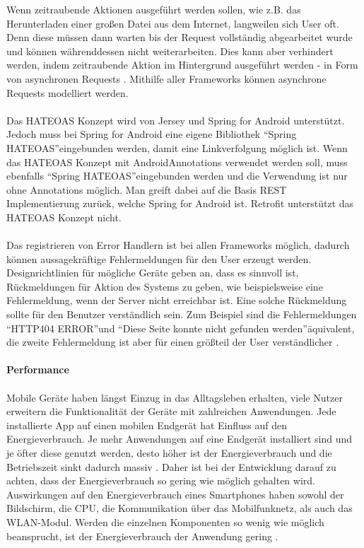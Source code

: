 Wenn zeitraubende Aktionen ausgeführt werden sollen, wie z.B. das Herunterladen einer großen Datei aus dem Internet, langweilen sich User oft. Denn diese müssen dann warten bis der Request vollständig abgearbeitet wurde und können währenddessen nicht weiterarbeiten. Dies kann aber verhindert werden, indem zeitraubende Aktion im Hintergrund ausgeführt werden - in Form von asynchronen Requests \cite{louis:android}. Mithilfe aller Frameworks können asynchrone Requests modelliert werden. 
\\\\
Das HATEOAS Konzept wird von Jersey und Spring for Android unterstützt. Jedoch muss bei Spring for Android eine eigene Bibliothek \textquotedblleft Spring HATEOAS\textquotedblright eingebunden werden, damit eine Linkverfolgung möglich ist. Wenn das HATEOAS Konzept mit AndroidAnnotations verwendet werden soll, muss ebenfalls \textquotedblleft Spring HATEOAS\textquotedblright eingebunden werden und die Verwendung ist nur ohne Annotations möglich. Man greift dabei auf die Basis REST Implementierung zurück, welche Spring for Android ist. Retrofit unterstützt das HATEOAS Konzept nicht.
\\\\
Das registrieren von Error Handlern ist bei allen Frameworks möglich, dadurch können aussagekräftige Fehlermeldungen für den User erzeugt werden. Designrichtlinien für mögliche Geräte geben an, dass es sinnvoll ist, Rückmeldungen für Aktion des Systems zu geben, wie beispielsweise eine Fehlermeldung, wenn der Server nicht erreichbar ist. Eine solche Rückmeldung sollte für den Benutzer verständlich sein. Zum Beispiel sind die Fehlermeldungen \textquotedblleft HTTP404 ERROR\textquotedblright und \textquotedblleft Diese Seite konnte nicht gefunden werden\textquotedblright äquivalent, die zweite Fehlermeldung ist aber für einen größteil der User verständlicher \cite{gong2004guidelines}.
\\\\
{\large \textbf{Performance}}\\\\
Mobile Geräte haben längst Einzug in das Alltagsleben erhalten, viele Nutzer erweitern die Funktionalität der Geräte mit zahlreichen Anwendungen. Jede installierte App auf einen mobilen Endgerät hat Einfluss auf den Energieverbrauch. Je mehr Anwendungen auf eine Endgerät installiert sind und je öfter diese genutzt werden, desto höher ist der Energieverbrauch und die Betriebszeit sinkt dadurch massiv \cite{Wil2012}. Daher ist bei der Entwicklung darauf zu achten, dass der Energieverbrauch so gering wie möglich gehalten wird. Auswirkungen auf den Energieverbrauch eines Smartphones haben sowohl der Bildschirm, die \acrfull{CPU}, die Kommunikation über das Mobilfunknetz, als auch das WLAN-Modul. Werden die einzelnen Komponenten so wenig wie möglich beansprucht, ist der Energieverbrauch der Anwendung gering \cite{vetter}. 
